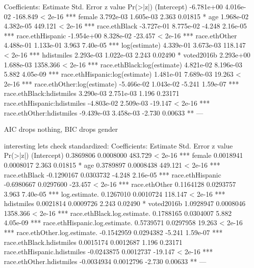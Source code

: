 Coefficients:
                                 Estimate Std. Error  z value Pr(>|z|)    
(Intercept)                    -6.781e+00  4.016e-02 -168.849  < 2e-16 ***
female                          3.792e-03  1.605e-03    2.363  0.01815 *  
age                             1.968e-02  4.382e-05  449.121  < 2e-16 ***
race.ethBlack                  -3.727e-01  8.775e-02   -4.248 2.16e-05 ***
race.ethHispanic               -1.954e+00  8.328e-02  -23.457  < 2e-16 ***
race.ethOther                   4.488e-01  1.133e-01    3.963 7.40e-05 ***
log(estimate)                   4.339e-01  3.673e-03  118.147  < 2e-16 ***
hdistmiles                      2.293e-03  1.022e-03    2.243  0.02490 *  
voted2016b                      2.293e+00  1.688e-03 1358.366  < 2e-16 ***
race.ethBlack:log(estimate)     4.821e-02  8.196e-03    5.882 4.05e-09 ***
race.ethHispanic:log(estimate)  1.481e-01  7.689e-03   19.263  < 2e-16 ***
race.ethOther:log(estimate)    -5.466e-02  1.043e-02   -5.241 1.59e-07 ***
race.ethBlack:hdistmiles        3.290e-03  2.751e-03    1.196  0.23171    
race.ethHispanic:hdistmiles    -4.803e-02  2.509e-03  -19.147  < 2e-16 ***
race.ethOther:hdistmiles       -9.439e-03  3.458e-03   -2.730  0.00633 ** 
---

AIC drops nothing, BIC drops gender

interesting lets check standardized:
Coefficients:
                                 Estimate Std. Error  z value Pr(>|z|)    
(Intercept)                     0.3869806  0.0008000  483.729  < 2e-16 ***
female                          0.0018941  0.0008017    2.363  0.01815 *  
age                             0.3789897  0.0008438  449.121  < 2e-16 ***
race.ethBlack                  -0.1290167  0.0303732   -4.248 2.16e-05 ***
race.ethHispanic               -0.6980667  0.0297600  -23.457  < 2e-16 ***
race.ethOther                   0.1164128  0.0293757    3.963 7.40e-05 ***
log.estimate.                   0.1267010  0.0010724  118.147  < 2e-16 ***
hdistmiles                      0.0021814  0.0009726    2.243  0.02490 *  
voted2016b                      1.0928947  0.0008046 1358.366  < 2e-16 ***
race.ethBlack.log.estimate.     0.1788165  0.0304007    5.882 4.05e-09 ***
race.ethHispanic.log.estimate.  0.5739571  0.0297958   19.263  < 2e-16 ***
race.ethOther.log.estimate.    -0.1542959  0.0294382   -5.241 1.59e-07 ***
race.ethBlack.hdistmiles        0.0015174  0.0012687    1.196  0.23171    
race.ethHispanic.hdistmiles    -0.0243875  0.0012737  -19.147  < 2e-16 ***
race.ethOther.hdistmiles       -0.0034934  0.0012796   -2.730  0.00633 ** 
---


